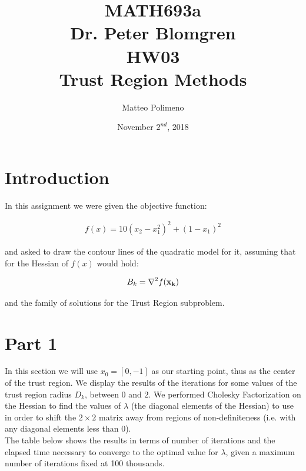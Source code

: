 \documentclass[a4paper,11pt]{article}
\author{Matteo Polimeno}
\date{November $2^{nd}$, 2018}
\title{MATH693a\\
	Dr. Peter Blomgren\\
	HW03\\
	Trust Region Methods}
\begin{document}
\maketitle
\section*{Introduction}
In this assignment we were given the objective function:

\begin{align}
f(x) = 10(x_{2}-x_{1}^{2})^{2}+(1-x_{1})^{2} 
\end{align}

and asked to draw the contour lines of the quadratic model for it, assuming that for the Hessian of $f(x)$ would hold:

\begin{align}
B_{k} = \nabla^{2}f{({\bf x_{k})}}
\end{align}

and the family of solutions for the Trust Region subproblem.

\section*{Part 1}
In this section we will use $x_{0}=[0, -1]$ as our starting point, thus as the center of the trust region. We display the results of the iterations for some values of the trust region radius $D_{k}$, between $0$ and $2$.
We performed Cholesky Factorization on the Hessian to find the values of $\lambda$ (the diagonal elements of the Hessian) to use in order to shift the $2\times{2}$ matrix away from regions of non-definiteness (i.e. with any diagonal elements less than 0).\\
The table below shows the results in terms of number of iterations and the elapsed time necessary to converge to the optimal value for $\lambda$, given a maximum number of iterations fixed at 100 thousands.
\end{document}

